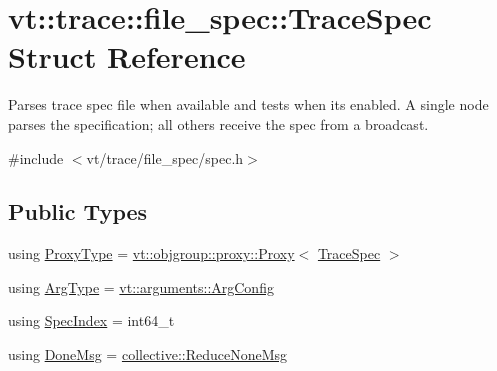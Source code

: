 \hypertarget{structvt_1_1trace_1_1file__spec_1_1_trace_spec}{}\section{vt\+:\+:trace\+:\+:file\+\_\+spec\+:\+:Trace\+Spec Struct Reference}
\label{structvt_1_1trace_1_1file__spec_1_1_trace_spec}


Parses trace spec file when available and tests when its enabled. A single node parses the specification; all others receive the spec from a broadcast.  




{\ttfamily \#include $<$vt/trace/file\+\_\+spec/spec.\+h$>$}

\subsection*{Public Types}
\begin{DoxyCompactItemize}
\item 
using \hyperlink{structvt_1_1trace_1_1file__spec_1_1_trace_spec_a26160cff9bb5115866943ed823405f1f}{Proxy\+Type} = \hyperlink{structvt_1_1objgroup_1_1proxy_1_1_proxy}{vt\+::objgroup\+::proxy\+::\+Proxy}$<$ \hyperlink{structvt_1_1trace_1_1file__spec_1_1_trace_spec}{Trace\+Spec} $>$
\item 
using \hyperlink{structvt_1_1trace_1_1file__spec_1_1_trace_spec_a273c85ad6266102f3cf20f72a739fd95}{Arg\+Type} = \hyperlink{structvt_1_1arguments_1_1_arg_config}{vt\+::arguments\+::\+Arg\+Config}
\item 
using \hyperlink{structvt_1_1trace_1_1file__spec_1_1_trace_spec_a4dd2e8fb971930351812d0f286baece2}{Spec\+Index} = int64\+\_\+t
\item 
using \hyperlink{structvt_1_1trace_1_1file__spec_1_1_trace_spec_a31fc42c00ddc382be9c198459793e1e9}{Done\+Msg} = \hyperlink{namespacevt_1_1collective_aa439a90f05078f2bcf918641c951946f}{collective\+::\+Reduce\+None\+Msg}
\end{DoxyCompactItemize}
